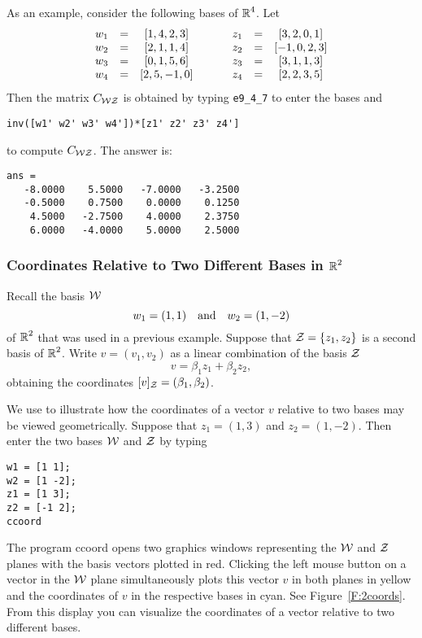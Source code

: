 \documentclass{ximera}
\begin{document}
As an example, consider the following bases of $\mbox{$\Bbb{R}$}^4$.  Let
\begin{equation*}
\begin{array}{ccccccc}
w_1 & = & [1, 4, 2, 3] & \hspace{0.2in} & z_1 & = & [3, 2, 0, 1] \\
w_2 & = & [2, 1, 1, 4] &  		    & z_2 & = & [-1, 0, 2, 3] \\
w_3 & = & [0, 1, 5, 6] & 		    & z_3 & = & [3, 1, 1, 3] \\
w_4 & = & [2, 5, -1, 0] & 		    & z_4 & = & [2, 2, 3, 5]
\end{array}
\end{equation*}
Then the matrix $C_{\cal WZ}$ is obtained by typing {\tt e9\_4\_7} to
enter the bases and
\begin{verbatim}
inv([w1' w2' w3' w4'])*[z1' z2' z3' z4']
\end{verbatim}
to compute $C_{\cal WZ}$.  The answer is:
\begin{verbatim}
ans =
   -8.0000    5.5000   -7.0000   -3.2500
   -0.5000    0.7500    0.0000    0.1250
    4.5000   -2.7500    4.0000    2.3750
    6.0000   -4.0000    5.0000    2.5000
\end{verbatim}



\subsubsection*{Coordinates Relative to Two Different Bases in $\mbox{$\Bbb{R}$}^2$}

Recall the basis ${\cal W}$
\[
w_1=(1,1) \quad\mbox{and}\quad w_2=(1,-2)
\]
of $\mbox{$\Bbb{R}$}^2$ that was used in a previous example.  Suppose that
${\cal Z}=\{z_1,z_2\}$ is a second basis of $\mbox{$\Bbb{R}$}^2$.  Write $v=(v_1,v_2)$
as a linear combination of the basis ${\cal Z}$
\[
v=\beta_1z_1 + \beta_2z_2,
\]
obtaining the coordinates $[v]_{\cal Z}=(\beta_1,\beta_2)$.

We use \Matlab to illustrate how the coordinates of a vector $v$ relative
to two bases may be viewed geometrically.  Suppose that $z_1=(1,3)$ and
$z_2=(1,-2)$.  Then enter the two bases ${\cal W}$ and ${\cal Z}$ by typing
\begin{verbatim}
w1 = [1 1];
w2 = [1 -2];
z1 = [1 3];
z2 = [-1 2];
ccoord
\end{verbatim}


The \Matlab program {\sf ccoord} opens two
graphics windows
representing the ${\cal W}$ and ${\cal Z}$ planes with the basis
vectors plotted in red.  Clicking the left mouse button on a
vector in the ${\cal W}$ plane simultaneously plots this vector
$v$ in both planes in yellow and the coordinates of $v$ in the
respective bases in cyan.  See Figure~\ref{F:2coords}.  From
this display you can visualize the coordinates of a
vector relative to two different bases.
\end{document}
